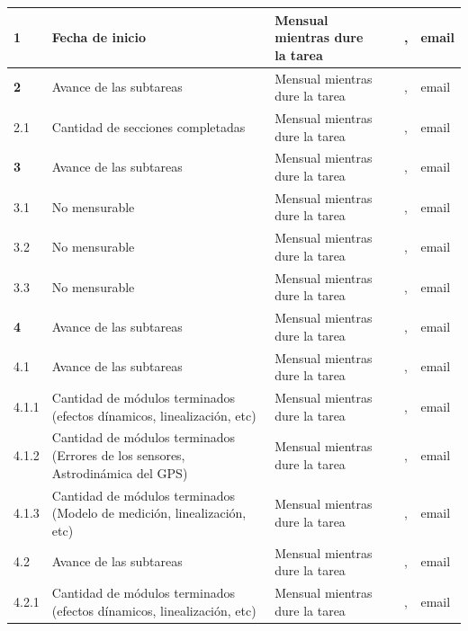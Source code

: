 \documentclass[11pt]{charter}
\begin{document}
\begin{longtable}{|m{1cm}|m{3.5cm}|m{2.2cm}|m{2cm}|m{3cm}|m{1.5cm}|}
\rowcolor{lightgray!50}
\textbf{1}					& Fecha de inicio  & Mensual mientras dure la tarea & \authorname & \clientename, \supname & email \\ \hline
\rowcolor{lightgray!50}
\textbf{2}					& Avance de las subtareas  & Mensual mientras dure la tarea & \authorname & \clientename, \supname & email \\ \hline
2.1 						& Cantidad de secciones completadas  & Mensual mientras dure la tarea & \authorname & \clientename, \supname & email \\ \hline
\rowcolor{lightgray!50}
\textbf{3}					& Avance de las subtareas  & Mensual mientras dure la tarea & \authorname & \clientename, \supname & email \\ \hline
3.1							& No mensurable  			& Mensual mientras dure la tarea & \authorname & \clientename, \supname & email \\ \hline
3.2							& No mensurable  			& Mensual mientras dure la tarea & \authorname & \clientename, \supname & email \\ \hline
3.3							& No mensurable  			& Mensual mientras dure la tarea & \authorname & \clientename, \supname & email \\ \hline
\rowcolor{lightgray!50}
\textbf{4}					& Avance de las subtareas  & Mensual mientras dure la tarea & \authorname & \clientename, \supname & email \\ \hline
\rowcolor{lightgray!25}
4.1							& Avance de las subtareas  & Mensual mientras dure la tarea & \authorname & \clientename, \supname & email \\ \hline
4.1.1						& Cantidad de módulos terminados (efectos dínamicos, linealización, etc)  & Mensual mientras dure la tarea & \authorname & \clientename, \supname & email \\ \hline
4.1.2						& Cantidad de módulos terminados (Errores de los sensores, Astrodinámica del GPS) & Mensual mientras dure la tarea & \authorname & \clientename, \supname & email \\ \hline
4.1.3						& Cantidad de módulos terminados (Modelo de medición, linealización, etc)  & Mensual mientras dure la tarea & \authorname & \clientename, \supname & email \\ \hline
\rowcolor{lightgray!25}
4.2							& Avance de las subtareas  & Mensual mientras dure la tarea & \authorname & \clientename, \supname & email \\ \hline
4.2.1						& Cantidad de módulos terminados (efectos dínamicos, linealización, etc)  & Mensual mientras dure la tarea & \authorname & \clientename, \supname & email \\ \hline

\end{longtable}
\end{document}
